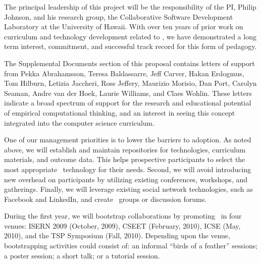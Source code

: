 

The principal leadership of this project will be the responsibility of the
PI, Philip Johnson, and his research group, the Collaborative Software
Development Laboratory at the University of Hawaii.  With over ten years of
prior work on curriculum and technology development related to \eCT, we have
demonstrated a long term interest, commitment, and successful track record
for this form of pedagogy.

The Supplemental Documents section of this proposal contains letters of
support from Pekka Abrahamsson, Teresa Baldassarre, Jeff Carver, Hakan
Erdogmus, Tom Hilburn, Letizia Jaccheri, Ross Jeffery, Maurizio Morisio,
Dan Port, Carolyn Seaman, Andre van der Hoek, Laurie Williams, and Claes
Wohlin.  These letters indicate a broad spectrum of support for the
research and educational potential of empirical computational thinking, and an interest in
seeing this concept integrated into the computer science curriculum.

One of our management priorities is to lower the barriers to adoption.  As
noted above, we will establish and maintain repositories for technologies,
curriculum materials, and outcome data.  This helps prospective
participants to select the most appropriate \eCT\ technology for their
needs.  Second, we will avoid introducing new overhead on participants by
utilizing existing conferences, workshops, and gatherings.  Finally, we
will leverage existing social network technologies, such as Facebook and
LinkedIn, and create \eCT\ groups or discussion forums.

During the first year, we will bootstrap collaborations by promoting \eCT\
in four venues: ISERN 2009 (October, 2009), CSEET (February, 2010), ICSE
(May, 2010), and the TSP Symposium (Fall, 2010). Depending upon the venue,
bootstrapping activities could consist of: an informal ``birds of a
feather'' sessions; a poster session; a short talk; or a tutorial session.  

